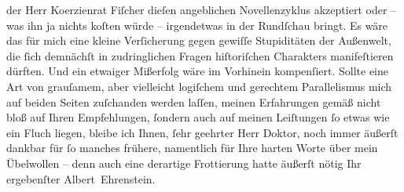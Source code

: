 \begin{ledgroupsized}[t]{13cm}
                    der Herr Ko{\geminationm}erzienrat Fiſcher dieſen angeblichen Novellenzyklus akzeptiert oder
                    – was ihn ja nichts koſten würde – irgendetwas in der Rundſchau bringt. Es wäre das für mich eine kleine
                    Verſicherung gegen gewiſſe Stupiditäten der Außenwelt, die ſich demnächſt in
                    zudringlichen Fragen hiſtoriſchen Charakters manifeſtieren dürften.\pend
           \pstart
           {\pb}Und ein etwaiger Mißerfolg wäre im Vorhinein
                    kompenſiert.\pend
           \pstart
           Sollte eine Art von grauſamem, aber vielleicht logiſchem und gerechtem
                    Parallelismus mich auf beiden Seiten zuſchanden werden laſſen, meinen
                    Erfahrungen gemäß nicht bloß auf Ihren Empfehlungen, ſondern auch auf meinen
                    Leiſtungen ſo etwas wie ein Fluch liegen, bleibe ich Ihnen, ſehr geehrter Herr
                    Doktor, noch immer äußerſt dankbar für ſo manches frühere, namentlich für Ihre
                    harten Worte über mein Übelwollen – denn auch eine derartige Frottierung hatte
                    äußerſt nötig Ihr ergebenſter\pend
           \pstart \spacefill\mbox{Albert Ehrenstein.}\pend{}          \endnumbering{}\end{ledgroupsized}  \newcommand{\dateiname}{L01884}\newcommand{\titel}{Albert Ehrenstein an Arthur Schnitzler, 6. 11. 1909}\newcommand{\editorInnen}{Martin Anton Müller und Gerd-Hermann Susen}
      